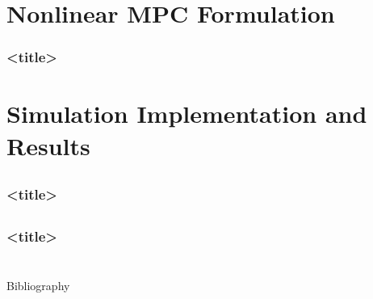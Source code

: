 \documentclass[aspectratio=169]{beamer}
\begin{document}
\section{Nonlinear MPC Formulation}


\begin{frame}
	\frametitle{<title>}

	

\end{frame}

\section{Simulation Implementation and Results}
\subsection{}
\begin{frame}
	\frametitle{<title>}

	

\end{frame}

\subsection{}
\begin{frame}
	\frametitle{<title>}

	

\end{frame}





\section*{}




\begin{frame}[allowframebreaks]{Bibliography}
	
	
\end{frame}
\end{document}
